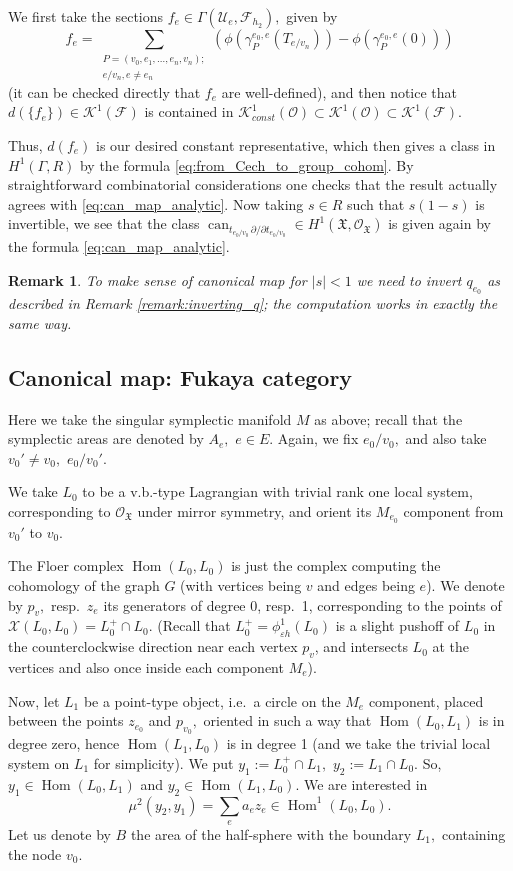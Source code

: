 \documentclass[11pt,leqno]{amsart}
\newtheorem{remark}[theo]{Remark}
\numberwithin{equation}{section}
\def\Hom{\operatorname{Hom}}
\newcommand{\can}{\operatorname{can}}
\newcommand{\cF}{{\mathcal F}}
\newcommand{\cO}{{\mathcal O}}
\newcommand{\cU}{{\mathcal U}}
\newcommand{\cK}{{\mathcal K}}
\newcommand{\cX}{{\mathcal X}}
\newcommand{\mX}{{\mathfrak X}}
\begin{document}
We first take the sections $f_{e}\in\Gamma(\cU_{e},\cF_{h_2}),$ given by
$$f_{e}=\sum\limits_{\substack{P=(v_0,e_1,\dots,e_n,v_n);\\
e/v_n,e\ne e_n}}(\phi(\gamma_P^{e_0,e}(T_{e/v_n}))-\phi(\gamma_P^{e_0,e}(0)))$$
(it can be checked directly that $f_{e}$ are well-defined), and then notice that $d(\{f_{e}\})\in \cK^1(\cF)$ is contained in $\cK^1_{const}(\cO)\subset \cK^1(\cO)\subset \cK^1(\cF).$

Thus, $d(f_{e})$ is our desired constant representative, which then gives a class in $H^1(\Gamma,R)$ by the formula \eqref{eq:from_Cech_to_group_cohom}. By straightforward combinatorial considerations one checks that the result actually agrees with \eqref{eq:can_map_analytic}.  Now taking $s\in R$ such that $s(1-s)$ is invertible, we see that the class 
$\can_{t_{e_0/v_0}\,\partial/\partial t_{e_0/v_0}}\in H^1(\mX,\cO_{\mX})$ is given again by the formula \eqref{eq:can_map_analytic}.

\begin{remark}To make sense of canonical map for $|s|<1$ we need to invert $q_{e_0}$ as described in Remark \ref{remark:inverting_q}; the computation works in exactly the same way.\end{remark}

\subsection{Canonical map: Fukaya category}

Here we take the singular symplectic manifold $M$ as above; recall that the symplectic areas are denoted by $A_{e},$ $e\in E.$ Again, we fix $e_0/v_0,$ and also take $v_0'\ne v_0,$ $e_0/v_0'.$ 

We take $L_0$ to be a v.b.-type Lagrangian with trivial rank one local system, 
corresponding to $\cO_{\mX}$ under mirror symmetry, and orient its $M_{e_0}$ component from $v_0'$ to $v_0$.

The Floer complex $\Hom(L_0,L_0)$ is just the complex computing the cohomology of the graph $G$ (with vertices being $v$ and edges being $e$). We denote by $p_{v},$ resp.\ $z_{e}$ its generators of degree 0, resp.~1,
corresponding to the points of $\cX(L_0,L_0)=L_0^+\cap L_0$. (Recall that $L_0^+=\phi^1_{\varepsilon h}(L_0)$ is a slight pushoff of $L_0$ in 
the counterclockwise direction near each vertex $p_v$, and intersects $L_0$ at the vertices and also once inside each component $M_e$).

Now, let $L_1$ be a point-type object, i.e.\ a circle on the $M_e$ component, placed between the points $z_{e_0}$ and $p_{v_0},$ oriented in such a way that $\Hom(L_0,L_1)$ is in degree zero, hence $\Hom(L_1,L_0)$ is in degree 1 (and we take the trivial local system on $L_1$ for simplicity). We put $y_1:=L_0^+\cap L_1,$ $y_2:=L_1\cap L_0.$ So, $y_1\in\Hom(L_0,L_1)$ and $y_2\in\Hom(L_1,L_0).$ We are interested in 
$$\mu^2(y_2,y_1)=\sum\limits_{e}a_{e}z_{e}\in\Hom^1(L_0,L_0).$$ Let us denote by $B$ the area of the half-sphere with the boundary $L_1,$ containing the node $v_0.$
\end{document}
